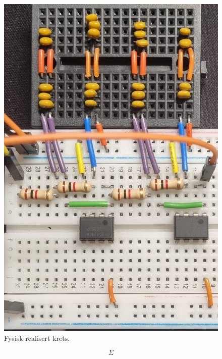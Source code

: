 \begin{figure}[!hbt]
	\centering
	\includegraphics[scale=0.1]{./Images/03Research/03}
	\caption{Fysisk realisert krets.}
	\label{fig:03}
\end{figure}

\begin{equation}
    \Sigma
\end{equation}